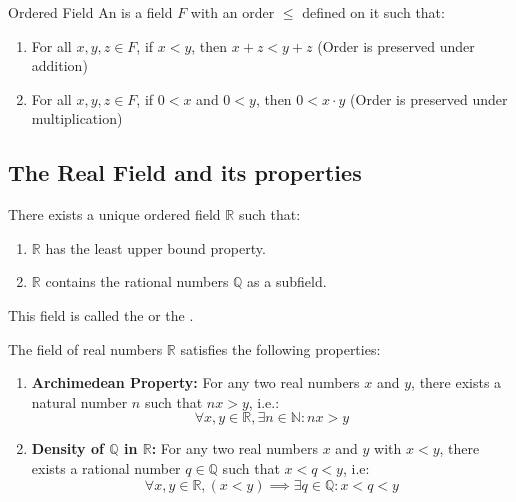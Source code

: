\documentclass[openany]{book}
\begin{document}
\begin{mydefinition}{Ordered Field}
    An  is a field $F$ with an order $\leq$ defined on it such that:
    \begin{enumerate}
        \item For all $x, y, z \in F$, if $x < y$, then $x + z < y + z$ (Order is preserved under addition)
        \item For all $x, y, z \in F$, if $0 < x$ and $0 < y$, then $0 < x \cdot y$ (Order is preserved under multiplication)
    \end{enumerate}
\end{mydefinition}
\subsection{The Real Field and its properties}
\begin{mytheorem}
    There exists a unique ordered field $\mathbb{R}$ such that:
    \begin{enumerate}
        \item $\mathbb{R}$ has the least upper bound property.
        \item $\mathbb{R}$ contains the rational numbers $\mathbb{Q}$ as a subfield.
    \end{enumerate}
    This field is called the  or the .
\end{mytheorem}
\begin{mytheorem}
    The field of real numbers $\mathbb{R}$ satisfies the following properties:
    \begin{enumerate}
        \item \textbf{Archimedean Property:} For any two real numbers $x$ and $y$, there exists a natural number $n$ such that $nx>y$, i.e.:
        $$\forall x, y \in \mathbb{R}, \exists n \in \mathbb{N}: nx >y$$
        \item \textbf{Density of $\mathbb{Q}$ in $\mathbb{R}$:} For any two real numbers $x$ and $y$ with $x < y$, there exists a rational number $q \in \mathbb{Q}$ such that $x < q < y$, i.e: 
        $$\forall x, y \in \mathbb{R}, (x < y) \implies \exists q \in \mathbb{Q}: x < q < y$$
    \end{enumerate}
\end{mytheorem}
\end{document}
